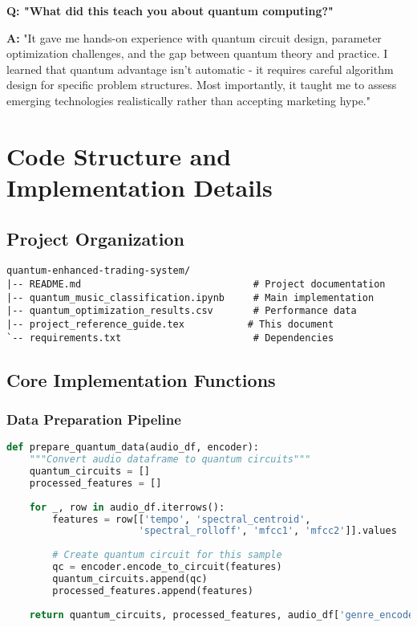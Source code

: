 \documentclass[11pt,a4paper]{article}
\begin{document}
\textbf{Q: "What did this teach you about quantum computing?"}

\textbf{A:} "It gave me hands-on experience with quantum circuit design, parameter optimization challenges, and the gap between quantum theory and practice. I learned that quantum advantage isn't automatic - it requires careful algorithm design for specific problem structures. Most importantly, it taught me to assess emerging technologies realistically rather than accepting marketing hype."

\section{Code Structure and Implementation Details}

\subsection{Project Organization}
\begin{verbatim}
quantum-enhanced-trading-system/
|-- README.md                              # Project documentation
|-- quantum_music_classification.ipynb     # Main implementation
|-- quantum_optimization_results.csv       # Performance data
|-- project_reference_guide.tex           # This document
`-- requirements.txt                       # Dependencies
\end{verbatim}

\subsection{Core Implementation Functions}

\subsubsection{Data Preparation Pipeline}
\begin{lstlisting}[language=Python]
def prepare_quantum_data(audio_df, encoder):
    """Convert audio dataframe to quantum circuits"""
    quantum_circuits = []
    processed_features = []
    
    for _, row in audio_df.iterrows():
        features = row[['tempo', 'spectral_centroid', 
                       'spectral_rolloff', 'mfcc1', 'mfcc2']].values
        
        # Create quantum circuit for this sample
        qc = encoder.encode_to_circuit(features)
        quantum_circuits.append(qc)
        processed_features.append(features)
    
    return quantum_circuits, processed_features, audio_df['genre_encoded'].values
\end{lstlisting}
\end{document}
